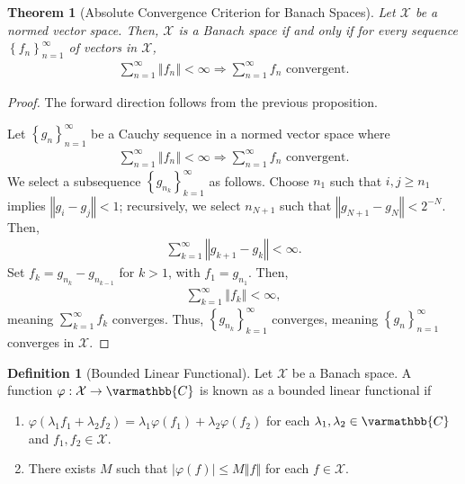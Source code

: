 \documentclass[12pt]{extarticle}
\newcommand{\C}{\mathbb{C}}
\newcommand{\norm}[1]{\left\Vert #1\right\Vert}
\newcommand{\set}[1]{\left\{#1\right\}}
\theoremstyle{plain}
\newtheorem*{theorem}{Theorem}
\theoremstyle{definition}
\newtheorem*{definition}{Definition}
\theoremstyle{note}
\renewcommand*{\mathbb}[1]{\varmathbb{#1}}
\renewcommand{\newline}{\hfill\break}
\begin{document}
\begin{theorem}[Absolute Convergence Criterion for Banach Spaces]
  Let $\mathcal{X}$ be a normed vector space. Then, $\mathcal{X}$ is a Banach space if and only if for every sequence $\set{f_{n}}_{n=1}^{\infty}$ of vectors in $\mathcal{X}$,
  \begin{align*}
    \sum_{n=1}^{\infty}\norm{f_n} < \infty \Rightarrow \sum_{n=1}^{\infty}f_n\text{ convergent.}
  \end{align*}
\end{theorem}
\begin{proof}
  The forward direction follows from the previous proposition.\newline

  Let $\set{g_n}_{n=1}^{\infty}$ be a Cauchy sequence in a normed vector space where
  \begin{align*}
    \sum_{n=1}^{\infty}\norm{f_n} < \infty \Rightarrow \sum_{n=1}^{\infty}f_n\text{ convergent.}
  \end{align*}
  We select a subsequence $\set{g_{n_k}}_{k=1}^{\infty}$ as follows. Choose $n_1$ such that $i,j\geq n_1$ implies $\norm{g_i - g_j} < 1$; recursively, we select $n_{N+1}$ such that $\norm{g_{N+1} - g_N} < 2^{-N}$. Then,
  \begin{align*}
    \sum_{k=1}^{\infty}\norm{g_{k+1} - g_k} < \infty.
  \end{align*}
  Set $f_k = g_{n_k} - g_{n_{k-1}}$ for $k > 1$, with $f_1 = g_{n_1}$. Then,
  \begin{align*}
    \sum_{k=1}^{\infty}\norm{f_{k}} < \infty,
  \end{align*}
  meaning $\displaystyle\sum_{k=1}^{\infty}f_k$ converges. Thus, $\set{g_{n_k}}_{k=1}^{\infty}$ converges, meaning $\set{g_{n}}_{n=1}^{\infty}$ converges in $\mathcal{X}$.
\end{proof}
\begin{definition}[Bounded Linear Functional]
Let $\mathcal{X}$ be a Banach space. A function $\varphi: \mathcal{X}\rightarrow \C$ is known as a bounded linear functional if
\begin{enumerate}[(1)]
  \item $\displaystyle \varphi(\lambda_1f_1 + \lambda_2f_2) = \lambda_1\varphi(f_1) + \lambda_2\varphi(f_2)$ for each $\lambda_1,\lambda_2\in \C$ and $f_1,f_2\in \mathcal{X}$.
  \item There exists $M$ such that $|\varphi(f)| \leq M\norm{f}$ for each $f\in \mathcal{X}$.
\end{enumerate}
\end{definition}
\end{document}
